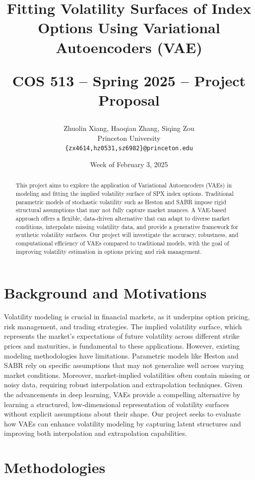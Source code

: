 \documentclass{article}
\title{Fitting Volatility Surfaces of Index Options Using Variational Autoencoders (VAE)\\
\begin{large} 
COS 513 -- Spring 2025 -- Project Proposal
\end{large} }
\author{Zhuolin Xiang, Haoqian Zhang, Siqing Zou \\
Princeton University \\
\texttt{\{zx4614,hz0531,sz6982\}@princeton.edu}}
\date{Week of February 3, 2025}
\begin{document}
\maketitle
\begin{abstract}
    This project aims to explore the application of Variational Autoencoders (VAEs) in modeling and fitting the implied volatility surface of SPX index options. Traditional parametric models of stochastic volatility such as Heston and SABR impose rigid structural assumptions that may not fully capture market nuances. A VAE-based approach offers a flexible, data-driven alternative that can adapt to diverse market conditions, interpolate missing volatility data, and provide a generative framework for synthetic volatility surfaces. Our project will investigate the accuracy, robustness, and computational efficiency of VAEs compared to traditional models, with the goal of improving volatility estimation in options pricing and risk management.
\end{abstract}

\section{Background and Motivations}


Volatility modeling is crucial in financial markets, as it underpins option pricing, risk management, and trading strategies. The implied volatility surface, which represents the market's expectations of future volatility across different strike prices and maturities, is fundamental to these applications. However, existing modeling methodologies have limitations. Parametric models like Heston and SABR rely on specific assumptions that may not generalize well across varying market conditions. Moreover, market-implied volatilities often contain missing or noisy data, requiring robust interpolation and extrapolation techniques. Given the advancements in deep learning, VAEs provide a compelling alternative by learning a structured, low-dimensional representation of volatility surfaces without explicit assumptions about their shape. Our project seeks to evaluate how VAEs can enhance volatility modeling by capturing latent structures and improving both interpolation and extrapolation capabilities.

\section{Methodologies}
\end{document}

